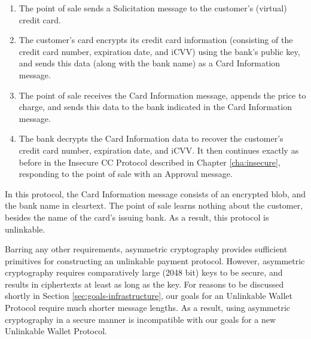 \begin{enumerate}
    \item The point of sale sends a Solicitation message to the customer's (virtual) credit card.
    \item The customer's card encrypts its credit card information (consisting of the credit card number, expiration date, and iCVV) using the bank's public key,
        and sends this data (along with the bank name) as a Card Information message.
    \item The point of sale receives the Card Information message, appends the price to charge, and sends this data to the bank indicated in the Card Information message.
    \item The bank decrypts the Card Information data to recover the customer's credit card number, expiration date, and iCVV.
        It then continues exactly as before in the Insecure CC Protocol described in Chapter \ref{cha:insecure}, responding to the point of sale with an Approval message.
\end{enumerate}

In this protocol, the Card Information message consists of an encrypted blob, and the bank name in cleartext.
The point of sale learns nothing about the customer, besides the name of the card's issuing bank.
As a result, this protocol is unlinkable.

Barring any other requirements, asymmetric cryptography provides sufficient primitives for constructing an unlinkable payment protocol.
However, asymmetric cryptography requires comparatively large (2048 bit) keys to be secure, and results in ciphertexts at least as long as the key.
For reasons to be discussed shortly in Section \ref{sec:goals-infrastructure}, our goals for an Unlinkable Wallet Protocol require much shorter message lengths.
As a result, using asymmetric cryptography in a secure manner is incompatible with our goals for a new Unlinkable Wallet Protocol.
